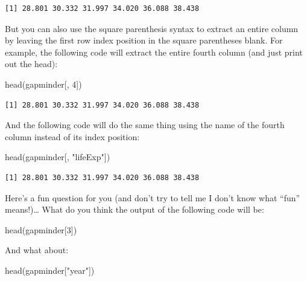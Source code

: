 \documentclass[
  letterpaper,
  DIV=11,
  numbers=noendperiod]{scrreprt}
\newenvironment{Shaded}{\begin{snugshade}}{\end{snugshade}}
\newcommand{\DecValTok}[1]{\textcolor[rgb]{0.68,0.00,0.00}{#1}}
\newcommand{\FunctionTok}[1]{\textcolor[rgb]{0.28,0.35,0.67}{#1}}
\newcommand{\NormalTok}[1]{\textcolor[rgb]{0.00,0.23,0.31}{#1}}
\newcommand{\StringTok}[1]{\textcolor[rgb]{0.13,0.47,0.30}{#1}}
\begin{document}
\begin{verbatim}
[1] 28.801 30.332 31.997 34.020 36.088 38.438
\end{verbatim}

But you can also use the square parenthesis syntax to extract an entire
column by leaving the first row index position in the square parentheses
blank. For example, the following code will extract the entire fourth
column (and just print out the head):

\begin{Shaded}
\begin{Highlighting}[]
\FunctionTok{head}\NormalTok{(gapminder[, }\DecValTok{4}\NormalTok{])}
\end{Highlighting}
\end{Shaded}

\begin{verbatim}
[1] 28.801 30.332 31.997 34.020 36.088 38.438
\end{verbatim}

And the following code will do the same thing using the name of the
fourth column instead of its index position:

\begin{Shaded}
\begin{Highlighting}[]
\FunctionTok{head}\NormalTok{(gapminder[, }\StringTok{"lifeExp"}\NormalTok{])}
\end{Highlighting}
\end{Shaded}

\begin{verbatim}
[1] 28.801 30.332 31.997 34.020 36.088 38.438
\end{verbatim}

Here's a fun question for you (and don't try to tell me I don't know
what ``fun'' means!)\ldots{} What do you think the output of the
following code will be:

\begin{Shaded}
\begin{Highlighting}[]
\FunctionTok{head}\NormalTok{(gapminder[}\DecValTok{3}\NormalTok{])}
\end{Highlighting}
\end{Shaded}

And what about:

\begin{Shaded}
\begin{Highlighting}[]
\FunctionTok{head}\NormalTok{(gapminder[}\StringTok{"year"}\NormalTok{])}
\end{Highlighting}
\end{Shaded}
\end{document}
